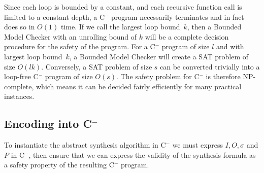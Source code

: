 \documentclass[a4paper]{llncs}
\newcommand{\newC}{C$^-$\xspace}
\begin{document}
\iffalse
Two example \newC programs are shown 
in Fig.~\ref{fig:c-}.

\begin{figure}
\begin{minipage}[scale=0.8]{0.45\linewidth}
 \begin{lstlisting}[language=c]
int count_bits(int x) {
  int i, ret = 0;
  
  for (i = 0; i < 32; i++)
    if (x & (1 << i))
      ret++;
  
  return ret;
}
 \end{lstlisting}
\end{minipage}
\begin{minipage}{0.54\linewidth}
 \begin{lstlisting}[language=C]
int common_factor(int A[10]) {
  int i, factor = nondet();

  for (i = 0; i < 10; i++)
    assume((A[i] % factor) == 0);

  assume(factor > 1);
  return factor;
}

 \end{lstlisting}
\end{minipage}

 \caption{Two \newC programs}
 \label{fig:c-}

\end{figure}
\fi

Since each loop is bounded by a constant, and each recursive function call is
limited to a constant depth, a \newC program necessarily terminates and in
fact does so in $O(1)$ time.  If we call the largest loop bound~$k$, then
a Bounded Model Checker with an unrolling bound of $k$ will be a complete
decision procedure for the safety of the program.  For a \newC program of
size $l$ and with largest loop bound~$k$, a Bounded Model Checker will
create a SAT problem of size $O(lk)$.  Conversely, a SAT problem
of size $s$ can be converted trivially into a loop-free \newC program
of size $O(s)$.  The safety problem for \newC is therefore NP-complete,
which means it can be decided fairly efficiently for many practical
instances.


\subsection{Encoding into \newC}
To instantiate the abstract synthesis algorithm in \newC we must express $I, O,
\sigma$ and $P$ in \newC, then ensure that we can express the validity of the
synthesis formula as a safety property of the resulting \newC program.
\end{document}
